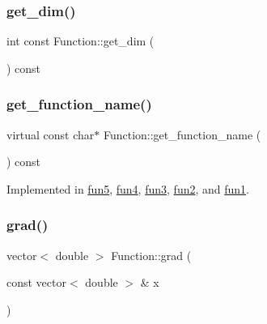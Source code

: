 \mbox{\label{class_function_ab822c64ba8beb7fd17e8b1a38b8ff9ca}} 
\subsubsection{\texorpdfstring{get\+\_\+dim()}{get\_dim()}}
{\footnotesize\ttfamily int const Function\+::get\+\_\+dim (\begin{DoxyParamCaption}{ }\end{DoxyParamCaption}) const}

\mbox{\label{class_function_a928c579622c47d98e91477ef18dec199}} 
\subsubsection{\texorpdfstring{get\+\_\+function\+\_\+name()}{get\_function\_name()}}
{\footnotesize\ttfamily virtual const char$\ast$ Function\+::get\+\_\+function\+\_\+name (\begin{DoxyParamCaption}{ }\end{DoxyParamCaption}) const\hspace{0.3cm}{\ttfamily [pure virtual]}}



Implemented in \hyperlink{classfun5_af90356003e95287857dd39404ba3f232}{fun5}, \hyperlink{classfun4_a8f28df4800e2e572cf60d2d02e299100}{fun4}, \hyperlink{classfun3_a51588a69a8a3a5c2a372b3c678e7d5a5}{fun3}, \hyperlink{classfun2_ad46fa2b40e24f7c13ea765f8ff5f9c24}{fun2}, and \hyperlink{classfun1_ad511ad7550fdfed650b5ded751f0f1e2}{fun1}.

\mbox{\label{class_function_a1396da5e1ee7418c76f14731128c08b4}} 
\subsubsection{\texorpdfstring{grad()}{grad()}}
{\footnotesize\ttfamily vector$<$ double $>$ Function\+::grad (\begin{DoxyParamCaption}\item[{const vector$<$ double $>$ \&}]{x }\end{DoxyParamCaption})\hspace{0.3cm}{\ttfamily [virtual]}}



